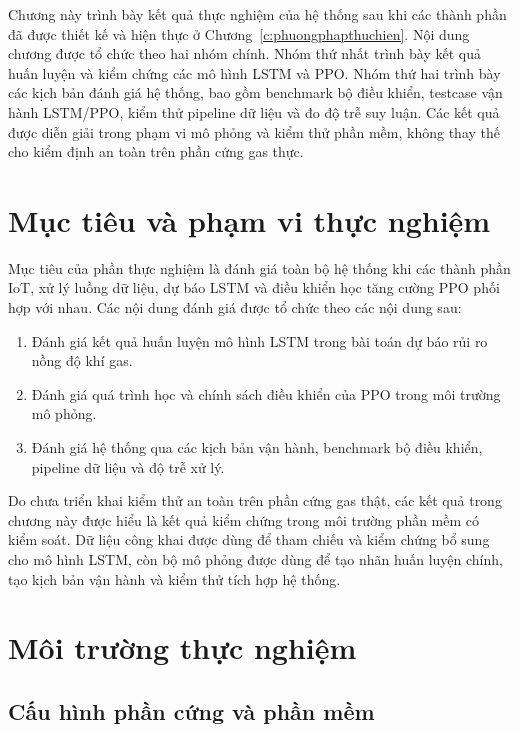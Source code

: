 
Chương này trình bày kết quả thực nghiệm của hệ thống sau khi các thành phần đã được thiết kế và hiện thực ở Chương~\ref{c:phuongphapthuchien}. Nội dung chương được tổ chức theo hai nhóm chính. Nhóm thứ nhất trình bày kết quả huấn luyện và kiểm chứng các mô hình LSTM và PPO. Nhóm thứ hai trình bày các kịch bản đánh giá hệ thống, bao gồm benchmark bộ điều khiển, testcase vận hành LSTM/PPO, kiểm thử pipeline dữ liệu và đo độ trễ suy luận. Các kết quả được diễn giải trong phạm vi mô phỏng và kiểm thử phần mềm, không thay thế cho kiểm định an toàn trên phần cứng gas thực.

\section{Mục tiêu và phạm vi thực nghiệm}
Mục tiêu của phần thực nghiệm là đánh giá toàn bộ hệ thống khi các thành phần IoT, xử lý luồng dữ liệu, dự báo LSTM và điều khiển học tăng cường PPO phối hợp với nhau. Các nội dung đánh giá được tổ chức theo các nội dung sau:

\begin{enumerate}
  \item Đánh giá kết quả huấn luyện mô hình LSTM trong bài toán dự báo rủi ro nồng độ khí gas.
  \item Đánh giá quá trình học và chính sách điều khiển của PPO trong môi trường mô phỏng.
  \item Đánh giá hệ thống qua các kịch bản vận hành, benchmark bộ điều khiển, pipeline dữ liệu và độ trễ xử lý.
\end{enumerate}

Do chưa triển khai kiểm thử an toàn trên phần cứng gas thật, các kết quả trong chương này được hiểu là kết quả kiểm chứng trong môi trường phần mềm có kiểm soát. Dữ liệu công khai được dùng để tham chiếu và kiểm chứng bổ sung cho mô hình LSTM, còn bộ mô phỏng được dùng để tạo nhãn huấn luyện chính, tạo kịch bản vận hành và kiểm thử tích hợp hệ thống.

\section{Môi trường thực nghiệm}

\subsection{Cấu hình phần cứng và phần mềm}

